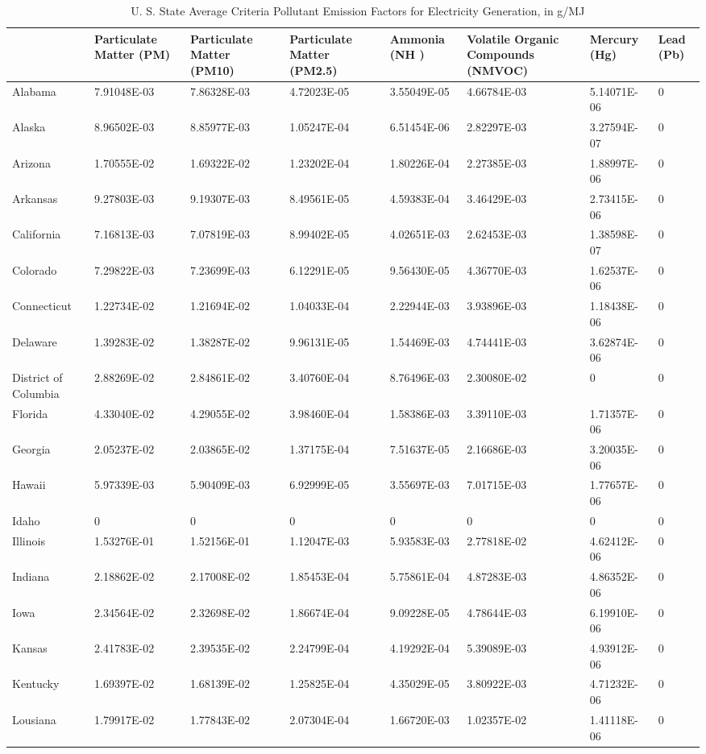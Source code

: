 \begin{longtable}[c]{p{0.75in}p{0.75in}p{0.75in}p{0.75in}p{0.75in}p{0.75in}p{0.75in}p{0.75in}}
\caption{  U. S. State Average Criteria Pollutant Emission Factors for Electricity Generation, in g/MJ \protect \label{table:u.-s.-state-average-criteria-pollutant}}\\
\toprule 
~ & Particulate Matter (PM) & Particulate Matter (PM10) & Particulate Matter (PM2.5) & Ammonia (NH  ) & Volatile Organic Compounds (NMVOC) & Mercury (Hg) & Lead (Pb) \tabularnewline \midrule
\endhead
Alabama & 7.91048E-03 & 7.86328E-03 & 4.72023E-05 & 3.55049E-05 & 4.66784E-03 & 5.14071E-06 & 0 \tabularnewline
Alaska & 8.96502E-03 & 8.85977E-03 & 1.05247E-04 & 6.51454E-06 & 2.82297E-03 & 3.27594E-07 & 0 \tabularnewline
Arizona & 1.70555E-02 & 1.69322E-02 & 1.23202E-04 & 1.80226E-04 & 2.27385E-03 & 1.88997E-06 & 0 \tabularnewline
Arkansas & 9.27803E-03 & 9.19307E-03 & 8.49561E-05 & 4.59383E-04 & 3.46429E-03 & 2.73415E-06 & 0 \tabularnewline
California & 7.16813E-03 & 7.07819E-03 & 8.99402E-05 & 4.02651E-03 & 2.62453E-03 & 1.38598E-07 & 0 \tabularnewline
Colorado & 7.29822E-03 & 7.23699E-03 & 6.12291E-05 & 9.56430E-05 & 4.36770E-03 & 1.62537E-06 & 0 \tabularnewline
Connecticut & 1.22734E-02 & 1.21694E-02 & 1.04033E-04 & 2.22944E-03 & 3.93896E-03 & 1.18438E-06 & 0 \tabularnewline
Delaware & 1.39283E-02 & 1.38287E-02 & 9.96131E-05 & 1.54469E-03 & 4.74441E-03 & 3.62874E-06 & 0 \tabularnewline
District of Columbia & 2.88269E-02 & 2.84861E-02 & 3.40760E-04 & 8.76496E-03 & 2.30080E-02 & 0 & 0 \tabularnewline
Florida & 4.33040E-02 & 4.29055E-02 & 3.98460E-04 & 1.58386E-03 & 3.39110E-03 & 1.71357E-06 & 0 \tabularnewline
Georgia & 2.05237E-02 & 2.03865E-02 & 1.37175E-04 & 7.51637E-05 & 2.16686E-03 & 3.20035E-06 & 0 \tabularnewline
Hawaii & 5.97339E-03 & 5.90409E-03 & 6.92999E-05 & 3.55697E-03 & 7.01715E-03 & 1.77657E-06 & 0 \tabularnewline
Idaho & 0 & 0 & 0 & 0 & 0 & 0 & 0 \tabularnewline
Illinois & 1.53276E-01 & 1.52156E-01 & 1.12047E-03 & 5.93583E-03 & 2.77818E-02 & 4.62412E-06 & 0 \tabularnewline
Indiana & 2.18862E-02 & 2.17008E-02 & 1.85453E-04 & 5.75861E-04 & 4.87283E-03 & 4.86352E-06 & 0 \tabularnewline
Iowa & 2.34564E-02 & 2.32698E-02 & 1.86674E-04 & 9.09228E-05 & 4.78644E-03 & 6.19910E-06 & 0 \tabularnewline
Kansas & 2.41783E-02 & 2.39535E-02 & 2.24799E-04 & 4.19292E-04 & 5.39089E-03 & 4.93912E-06 & 0 \tabularnewline
Kentucky & 1.69397E-02 & 1.68139E-02 & 1.25825E-04 & 4.35029E-05 & 3.80922E-03 & 4.71232E-06 & 0 \tabularnewline
Lousiana & 1.79917E-02 & 1.77843E-02 & 2.07304E-04 & 1.66720E-03 & 1.02357E-02 & 1.41118E-06 & 0 \tabularnewline

\end{longtable}
